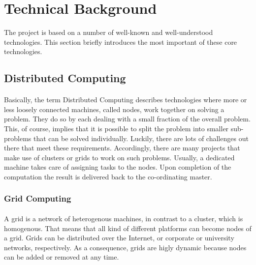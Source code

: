\section{Technical Background}
\paragraph{}
The project is based on a number of well-known and well-understood technologies. This section briefly introduces the most important of these core technologies.

\subsection{Distributed Computing}
\paragraph{}
Basically, the term Distributed Computing describes technologies where more or less loosely connected machines, called nodes, work together on solving a problem. They do so by each dealing with a small fraction of the overall problem. This, of course, implies that it is possible to split the problem into smaller sub-problems that can be solved individually. Luckily, there are lots of challenges out there that meet these requirements. Accordingly, there are many projects that make use of clusters or grids to work on such problems. Usually, a dedicated machine takes care of assigning tasks to the nodes. Upon completion of the computation the result is delivered back to the co-ordinating master.


\subsubsection{Grid Computing}
\paragraph{}
A grid is a network of heterogenous machines, in contrast to a cluster, which is homogenous. That means that all kind of different platforms can become nodes of a grid. Grids can be distributed over the Internet, or corporate or university networks, respectively. As a consequence, grids are higly dynamic because nodes can be added or removed at any time.

